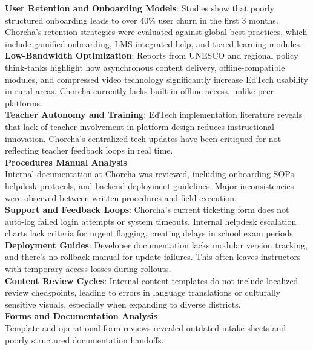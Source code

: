 \documentclass[12pt,a4paper,oneside]{book}
\begin{document}
\textbf{User Retention and Onboarding Models}: Studies show that poorly structured onboarding leads to over 40\% user churn in the first 3 months. Chorcha’s retention strategies were evaluated against global best practices, which include gamified onboarding, LMS-integrated help, and tiered learning modules.\\

\textbf{Low-Bandwidth Optimization}: Reports from UNESCO and regional policy think-tanks highlight how asynchronous content delivery, offline-compatible modules, and compressed video technology significantly increase EdTech usability in rural areas. Chorcha currently lacks built-in offline access, unlike peer platforms.\\

\textbf{Teacher Autonomy and Training}: EdTech implementation literature reveals that lack of teacher involvement in platform design reduces instructional innovation. Chorcha's centralized tech updates have been critiqued for not reflecting teacher feedback loops in real time.\\

\textbf{Procedures Manual Analysis} \\
Internal documentation at Chorcha was reviewed, including onboarding SOPs, helpdesk protocols, and backend deployment guidelines. Major inconsistencies were observed between written procedures and field execution.\\

\textbf{Support and Feedback Loops}: Chorcha’s current ticketing form does not auto-log failed login attempts or system timeouts. Internal helpdesk escalation charts lack criteria for urgent flagging, creating delays in school exam periods.\\

\textbf{Deployment Guides}: Developer documentation lacks modular version tracking, and there’s no rollback manual for update failures. This often leaves instructors with temporary access losses during rollouts.\\

\textbf{Content Review Cycles}: Internal content templates do not include localized review checkpoints, leading to errors in language translations or culturally sensitive visuals, especially when expanding to diverse districts.\\

\textbf{Forms and Documentation Analysis} \\
Template and operational form reviews revealed outdated intake sheets and poorly structured documentation handoffs.\\
\end{document}
